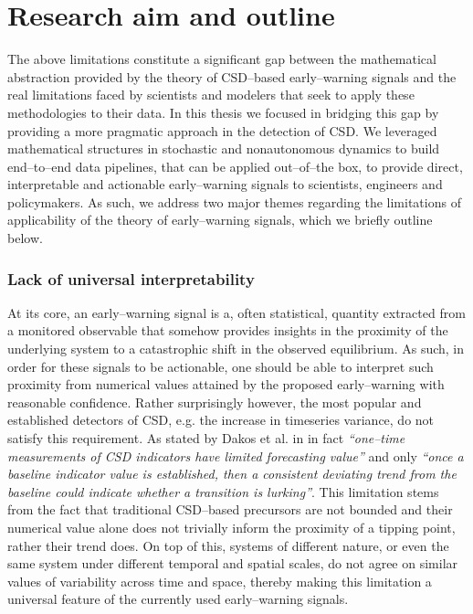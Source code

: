 \section{Research aim and outline}
The above limitations constitute a significant gap between the mathematical abstraction provided by the theory of CSD--based early--warning signals and the real limitations faced by scientists and modelers that seek to apply these methodologies to their data.
In this thesis we focused in bridging this gap by providing a more pragmatic approach in the detection of CSD.
We leveraged mathematical structures in stochastic and nonautonomous dynamics to build end--to--end data pipelines, that can be applied out--of--the box, to provide direct, interpretable and actionable early--warning signals to scientists, engineers and policymakers.
As such, we address two major themes regarding the limitations of applicability of the theory of early--warning signals, which we briefly outline below.

\subsubsection{Lack of universal interpretability}
At its core, an early--warning signal is a, often statistical, quantity extracted from a monitored observable that somehow provides insights in the proximity of the underlying system to a catastrophic shift in the observed equilibrium.
As such, in order for these signals to be actionable, one should be able to interpret such proximity from numerical values attained by the proposed early--warning with reasonable confidence.
Rather surprisingly however, the most popular and established detectors of CSD, e.g. the increase in timeseries variance, do not satisfy this requirement.
As stated by Dakos et al. in \cite{Dakos2015} in fact \emph{``one--time measurements of CSD indicators have limited forecasting value''} and only \emph{``once a baseline indicator value is established, then a consistent deviating trend from the baseline could indicate whether a transition is lurking''}.
This limitation stems from the fact that traditional CSD--based precursors are not bounded and their numerical value alone does not trivially inform the proximity of a tipping point, rather their trend does.
On top of this, systems of different nature, or even the same system under different temporal and spatial scales, do not agree on similar values of variability across time and space, thereby making this limitation a universal feature of the currently used early--warning signals.

